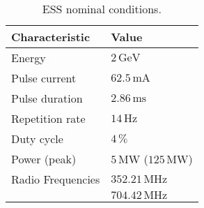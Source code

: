 \begin{table}[ht]
  \centering
  \caption[ESS nominal conditions]
  {ESS nominal conditions.}
  \label{chap2:ess_charac}
  \begin{tabular}{ll}
    \toprule
    Characteristic    & Value                                 \\
    \midrule
    Energy            & $2\,\mathrm{GeV}$                     \\
    Pulse current     & $62.5\,\mathrm{mA}$                   \\
    Pulse duration    & $2.86\,\mathrm{ms}$                   \\
    Repetition rate   & $14\,\mathrm{Hz}$                     \\
    Duty cycle        & $4\,\mathrm{\%}$                      \\
    Power (peak)      & $5\,\mathrm{MW}$ ($125\,\mathrm{MW}$) \\
    Radio Frequencies & $352.21\,\mathrm{MHz}$                \\
                      & $704.42\,\mathrm{MHz}$                \\
    \bottomrule
  \end{tabular}
\end{table}